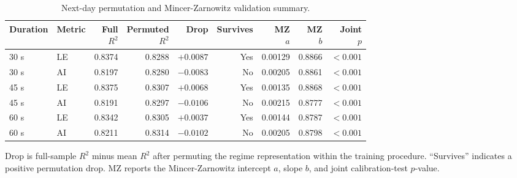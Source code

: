 
\begin{table}[t]
\centering
\caption{Next-day permutation and Mincer-Zarnowitz validation summary.}
\label{tab:nextday_validation}
\scriptsize
\setlength{\tabcolsep}{3.2pt}
\begin{tabular}{llrrrrrrr}
\toprule
Duration & Metric & \shortstack{Full\\\(R^2\)} &
\shortstack{Permuted\\\(R^2\)} & Drop & Survives &
\shortstack{MZ\\\(a\)} & \shortstack{MZ\\\(b\)} &
\shortstack{Joint\\\(p\)}\\
\midrule
30 s & LE & 0.8374 & 0.8288 & \(+0.0087\) & Yes & 0.00129 & 0.8866 & \(<0.001\)\\
30 s & AI & 0.8197 & 0.8280 & \(-0.0083\) & No  & 0.00205 & 0.8861 & \(<0.001\)\\
45 s & LE & 0.8375 & 0.8307 & \(+0.0068\) & Yes & 0.00135 & 0.8868 & \(<0.001\)\\
45 s & AI & 0.8191 & 0.8297 & \(-0.0106\) & No  & 0.00215 & 0.8777 & \(<0.001\)\\
60 s & LE & 0.8342 & 0.8305 & \(+0.0037\) & Yes & 0.00144 & 0.8787 & \(<0.001\)\\
60 s & AI & 0.8211 & 0.8314 & \(-0.0102\) & No  & 0.00205 & 0.8798 & \(<0.001\)\\
\bottomrule
\end{tabular}
\begin{minipage}{0.94\linewidth}\footnotesize
Drop is full-sample \(R^2\) minus mean \(R^2\) after permuting the regime
representation within the training procedure.  ``Survives'' indicates a
positive permutation drop.  MZ reports the Mincer-Zarnowitz intercept \(a\),
slope \(b\), and joint calibration-test \(p\)-value.
\end{minipage}
\end{table}
